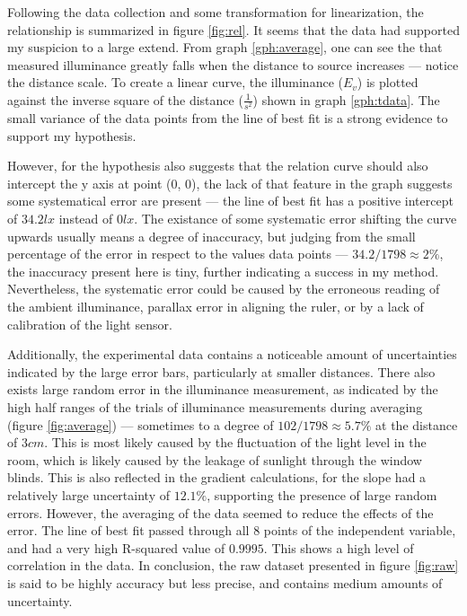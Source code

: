 \documentclass[a4paper,12pt]{article}
\begin{document}
Following the data collection and some transformation for linearization, the relationship is summarized in figure \ref{fig:rel}. It seems that the data had supported my suspicion to a large extend. From graph \ref{gph:average}, one can see the that measured illuminance  greatly falls when the distance to source increases --- notice the distance scale. To create a linear curve, the illuminance ($E_v$) is plotted against the inverse square of the distance ($\frac{1}{s^2}$) shown in graph \ref{gph:tdata}. The small variance of the data points from the line of best fit is a strong evidence to support my hypothesis.

However, for the hypothesis also suggests that the relation curve should also intercept the y axis at point (0, 0), the lack of that feature in the graph suggests some systematical error are present --- the line of best fit has a positive intercept of $34.2 \si{lx}$ instead of $0 \si{lx}$. The existance of some systematic error shifting the curve upwards usually means a degree of inaccuracy, but judging from the small percentage of the error in respect to the values data points --- $34.2 / 1798 \approx 2\%$, the inaccuracy present here is tiny, further indicating a success in my method. Nevertheless, the systematic error could be caused by the erroneous reading of the ambient illuminance, parallax error in aligning the ruler, or by a lack of calibration of the light sensor.

Additionally, the experimental data contains a noticeable amount of uncertainties indicated by the large error bars, particularly at smaller distances. There also exists large random error in the illuminance measurement, as indicated by the high half ranges of the trials of illuminance measurements during averaging (figure \ref{fig:average}) --- sometimes to a degree of $102/1798 \approx 5.7\%$ at the distance of $3\si{cm}$. This is most likely caused by the fluctuation of the light level in the room, which is likely caused by the leakage of sunlight through the window blinds. This is also reflected in the gradient calculations, for the slope had a relatively large uncertainty of $12.1\%$, supporting the presence of large random errors. However, the averaging of the data seemed to reduce the effects of the error. The line of best fit passed through all 8 points of the independent variable, and had a very high R-squared value of $0.9995$. This shows a high level of correlation in the data. In conclusion, the raw dataset presented in figure \ref{fig:raw} is said to be highly accuracy but less precise, and contains medium amounts of uncertainty.
\end{document}

